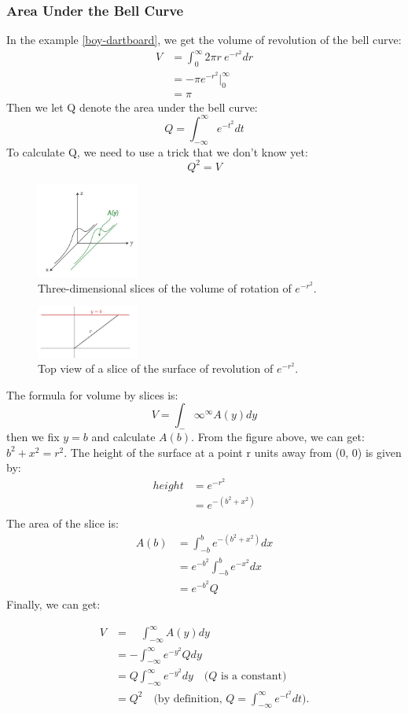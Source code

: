 \documentclass[10pt, a4paper]{article}
\begin{document}
\subsubsection*{Area Under the Bell Curve}
In the example \ref{boy-dartboard}, we get the volume of revolution of the bell curve:
\begin{align*}
    V &= \int_0^\infty2\pi r\mathrm{~}e^{-r^2}dr\\
    &= -\pi e^{-r^2}\Big|_0^\infty\\
    &= \pi
\end{align*}
Then we let Q denote the area under the bell curve:
\[ Q = \int_{-\infty}^\infty e^{-t^2}dt \]
To calculate Q, we need to use a trick that we don't know yet:
\[\boxed{Q^2  = V}\]
\begin{figure}
    \centering
    \includegraphics[width=0.3\textwidth]{Slices.jpg}
    \caption{Three-dimensional slices of the volume of rotation of $e^{-r^2}$.}
\end{figure}
\begin{figure}
    \centering
    \includegraphics[width=0.3\textwidth]{topview.jpg}
    \caption{Top view of a slice of the surface of revolution of $e^{-r^2}$.}
\end{figure}

The formula for volume by slices is:
\[ V = \int_-\infty^\infty A(y)dy \]
then we fix $y= b$ and calculate $A(b)$. From the figure above, we can get: $b^2 + x^2 = r^2$. 
The height of the surface at a point r units away from (0, 0) is given by: 
\begin{align*}
    height &= e^{-r^2} \\
    &= e^{-(b^2 + x^2)} \\
\end{align*}
The area of the slice is:
\begin{align*}
    A(b) &= \int_{-b}^b e^{-(b^2 + x^2)}dx \\
    &= e^{-b^2}\int_{-b}^b e^{-x^2}dx \\
    &= e^{-b^2}Q
\end{align*}
Finally, we can get:

\begin{align*}
    V & =\quad\int_{-\infty}^{\infty}A(y)dy  \\
    &=-\int_{-\infty}^{\infty}e^{-y^2}Qdy \\
    &= Q\int_{-\infty}^{\infty}e^{-y^2}dy \quad\text{($Q$ is a constant)} \\
    &= Q^2 \quad\text{(by definition, } Q=\int_{-\infty}^\infty e^{-t^2}dt).
\end{align*}
\end{document}
